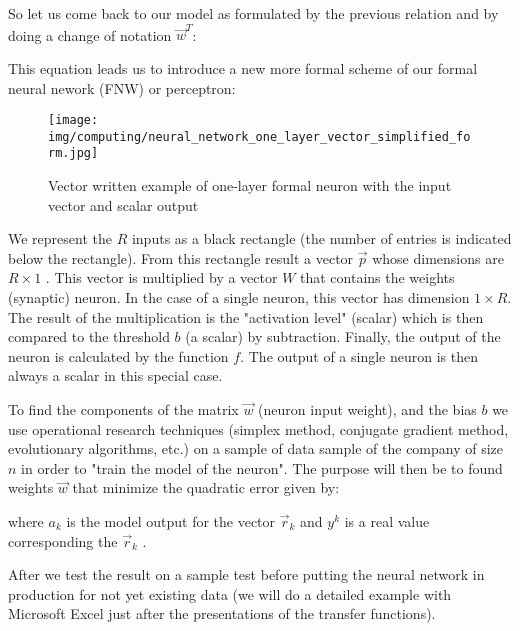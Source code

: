 	So let us come back to our model as formulated by the previous relation and by doing a change of notation $\vec{w}^T$:
	
	This equation leads us to introduce a new more formal scheme of our formal neural nework (FNW) or perceptron:
	\begin{figure}[H]
		\centering
		\texttt{[image: img/computing/neural\_network\_one\_layer\_vector\_simplified\_form.jpg]}
		\caption{Vector written example of one-layer formal neuron with the input vector and scalar output}
	\end{figure}
	We represent the $R$ inputs as a black rectangle (the number of entries is indicated below the rectangle). From this rectangle result a vector $\vec{p}$ whose dimensions are $R\times 1$ . This vector is multiplied by a vector $W$ that contains the weights (synaptic) neuron. In the case of a single neuron, this vector has dimension $1\times R$. The result of the multiplication is the "activation level" (scalar) which is then compared to the threshold $b$ (a scalar) by subtraction. Finally, the output of the neuron is calculated by the function $f$. The output of a single neuron is then always a scalar in this special case.

	To find the components of the matrix $\vec{w}$ (neuron input weight), and the bias $b$ we use operational research techniques (simplex method, conjugate gradient method, evolutionary algorithms, etc.) on a sample of data sample of the company of size $n$ in order to "train the model of the neuron". The purpose will then be to found weights $\vec{w}$ that minimize the quadratic error given by:
	
	where $a_k$ is the model output for the vector $\vec{r}_k$ and $y^k$ is a real value corresponding the $\vec{r}_k$ .
	
	After we test the result on a sample test before  putting the neural network in production for not yet existing data (we will do a detailed example with Microsoft Excel just after the presentations of the transfer functions).
		
	\pagebreak
